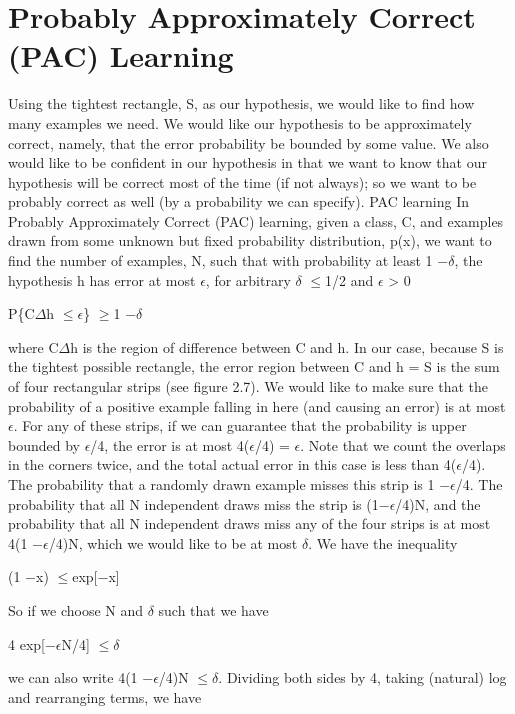 \section{Probably Approximately Correct (PAC) Learning}

Using the tightest rectangle, S, as our hypothesis, we would like to find how many examples we need. We would like our hypothesis to be approximately correct, namely, that the error probability be bounded by some value. We also would like to be confident in our hypothesis in that we want to know that our hypothesis will be correct most of the time (if not always); so we want to be probably correct as well (by a probability we can specify). PAC learning In Probably Approximately Correct (PAC) learning, given a class, C, and examples drawn from some unknown but fixed probability distribution, p(x), we want to find the number of examples, N, such that with probability at least 1 $-$$\delta$, the hypothesis h has error at most $\epsilon$, for arbitrary $\delta$ $\leq$1/2 and $\epsilon$ > 0

P\{C$\Delta$h $\leq$$\epsilon$\} $\geq$1 $-$$\delta$

where C$\Delta$h is the region of difference between C and h. In our case, because S is the tightest possible rectangle, the error region between C and h = S is the sum of four rectangular strips (see figure 2.7). We would like to make sure that the probability of a positive example falling in here (and causing an error) is at most $\epsilon$. For any of these strips, if we can guarantee that the probability is upper bounded by $\epsilon$/4, the error is at most 4($\epsilon$/4) = $\epsilon$. Note that we count the overlaps in the corners twice, and the total actual error in this case is less than 4($\epsilon$/4). The probability that a randomly drawn example misses this strip is 1 $-$$\epsilon$/4. The probability that all N independent draws miss the strip is (1$-$$\epsilon$/4)N, and the probability that all N independent draws miss any of the four strips is at most 4(1 $-$$\epsilon$/4)N, which we would like to be at most $\delta$. We have the inequality

(1 $-$x) $\leq$exp[$-$x]

So if we choose N and $\delta$ such that we have

4 exp[$-$$\epsilon$N/4] $\leq$$\delta$

we can also write 4(1 $-$$\epsilon$/4)N $\leq$$\delta$. Dividing both sides by 4, taking (natural) log and rearranging terms, we have

